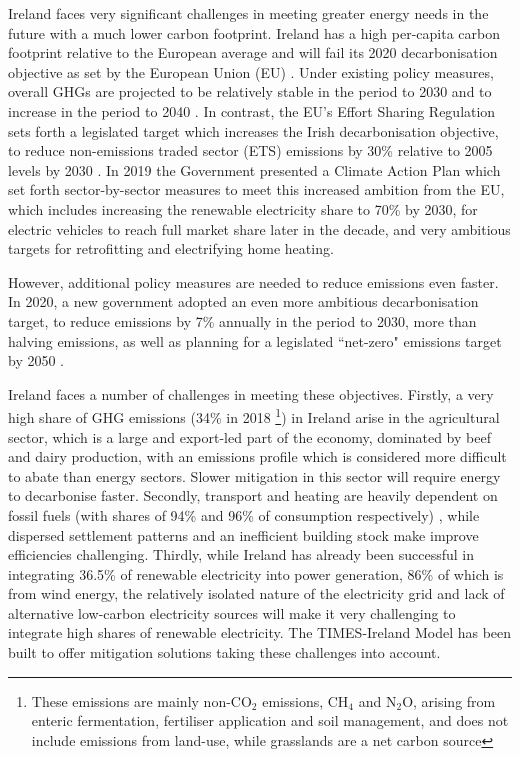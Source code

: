 \documentclass[journal abbreviation, manuscript]{copernicus}
\begin{document}
\introduction   %
Ireland faces very significant challenges in meeting greater energy needs in the future with a much lower carbon footprint. Ireland has a high per-capita carbon footprint relative to the European average and will fail its 2020 decarbonisation objective as set by the European Union (EU) \citep{DCCAE2019}. Under existing policy measures, overall GHGs are projected to be relatively stable in the period to 2030 and to increase in the period to 2040 \citep{EPA}. In contrast, the EU's Effort Sharing Regulation sets forth a legislated target which increases the Irish decarbonisation objective, to reduce non-emissions traded sector (ETS) emissions by 30\% relative to 2005 levels by 2030 \citep{CCAC2020}. In 2019 the Government presented a Climate Action Plan which set forth sector-by-sector measures to meet this increased ambition from the EU, which includes increasing the renewable electricity share to 70\% by 2030, for electric vehicles to reach full market share later in the decade, and very ambitious targets for retrofitting and electrifying home heating. 
 
However, additional policy measures are needed to reduce emissions even faster. In 2020, a new government adopted an even more ambitious decarbonisation target, to reduce emissions by 7\% annually in the period to 2030, more than halving emissions, as well as planning for a legislated ``net-zero" emissions target by 2050 \citep{DepartmentoftheTaoiseach2020}. 
 
Ireland faces a number of challenges in meeting these objectives. Firstly, a very high share of GHG emissions (34\% in 2018 \citep{EPA2019}\footnote{These emissions are mainly non-CO$_2$ emissions, CH$_4$ and N$_2$O, arising from enteric fermentation, fertiliser application and soil management, and does not include emissions from land-use, while grasslands are a net carbon source}) in Ireland arise in the agricultural sector, which is a large and export-led part of the economy, dominated by beef and dairy production, with an emissions profile which is considered more difficult to abate than energy sectors. Slower mitigation in this sector will require energy to decarbonise faster. Secondly, transport and heating are heavily dependent on fossil fuels (with shares of 94\% and 96\% of consumption respectively) \citep{SEAI2019}, while dispersed settlement patterns and an inefficient building stock make improve efficiencies challenging. Thirdly, while Ireland has already been successful in integrating 36.5\% of renewable electricity into power generation, 86\% of which is from wind energy, the relatively isolated nature of the electricity grid and lack of alternative low-carbon electricity sources will make it very challenging to integrate high shares of renewable electricity. The TIMES-Ireland Model has been built to offer mitigation solutions taking these challenges into account.
\end{document}
